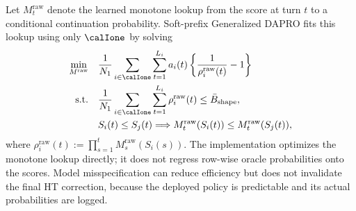 Let $M_t^{\mathrm{raw}}$ denote the learned monotone lookup from the score at
turn $t$ to a conditional continuation probability.  Soft-prefix Generalized
DAPRO fits this lookup using only $\calIone$ by solving
\begin{equation}
\begin{aligned}
    \min_{M^{\mathrm{raw}}}\quad&
      \frac{1}{N_1}\sum_{i\in\calIone}
      \sum_{t=1}^{L_i}a_i(t)
      \left\{\frac{1}{\rho_i^{\mathrm{raw}}(t)}-1\right\}\\
    \mathrm{s.t.}\quad&
      \frac{1}{N_1}\sum_{i\in\calIone}
      \sum_{t=1}^{L_i}\rho_i^{\mathrm{raw}}(t)
      \leq\bar B_{\mathrm{shape}},\\
    &S_i(t)\leq S_j(t)
      \Longrightarrow
      M_t^{\mathrm{raw}}(S_i(t))
      \leq M_t^{\mathrm{raw}}(S_j(t)),
\end{aligned}
\label{eq:dapro_main_optimization}
\end{equation}
where
$\rho_i^{\mathrm{raw}}(t):=\prod_{s=1}^{t}
M_s^{\mathrm{raw}}(S_i(s))$.  The implementation optimizes the monotone
lookup directly; it does not regress row-wise oracle probabilities onto the
scores.  Model misspecification can reduce efficiency but does not invalidate
the final HT correction, because the deployed policy is predictable and its
actual probabilities are logged.

